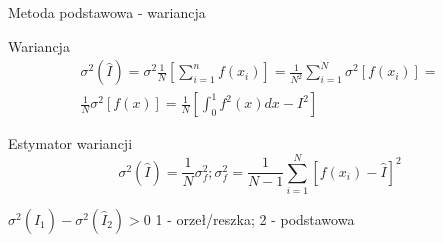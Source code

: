 \begin{frame}{Metoda podstawowa - wariancja}
	\vspace{-.5cm}
	\begin{block}{Wariancja}
		\begin{align*}
			\sigma^2(\hat{I}) = 
            \sigma^2 \frac{1}{N} \left[ 
            	\sum_{i=1}^n f(x_i)
            	\right] =
            \frac{1}{N^2} \sum_{i=1}^N \sigma^2 [f(x_i)] =
            \\
            \frac{1}{N} \sigma^2 [f(x)] = 
            \frac{1}{N} \left[ 
            	\int_0^1 f^2(x)dx - I^2
            	\right]
		\end{align*}
	\end{block}
    
    \begin{block}{Estymator wariancji}
    	\[
        	\sigma^2(\hat{I}) = \frac{1}{N} \sigma_f^2; 
            \sigma_f^2 = \frac{1}{N-1} \sum_{i=1}^N [f(x_i) - \hat{I}]^2
        \]
    \end{block}
    
    $\sigma^2(\hat{I}_1) - \sigma^2(\hat{I}_2) > 0$ \hspace{.5cm}
    1 - orzeł/reszka; \hspace{.5cm}
    2 - podstawowa
\end{frame}